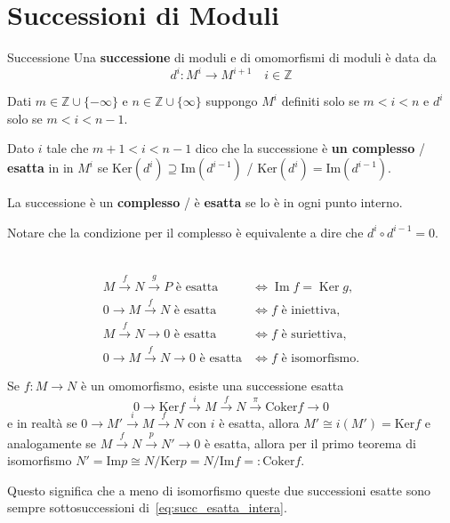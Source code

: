 \section{Successioni di Moduli}

\begin{definition}{Successione}
    Una \textbf{successione} di moduli e di omomorfismi di moduli è data da
    \[
      d^{i} : M^{i} \to M^{i+1} \quad i \in \mathbb{Z}
    \]

    Dati \(m \in \mathbb{Z} \cup \{-\infty\} \) e \(n \in \mathbb{Z} \cup
    \{\infty\} \) suppongo \(M^{i}\) definiti solo se \(m < i < n\) e \(d^{i}\)
    solo se \(m < i < n-1\).

    Dato \(i\) tale che \(m+1 < i < n-1\) dico che la successione è \textbf{un
    complesso} / \textbf{esatta} in in \(M^{i}\) se \(\mathrm{Ker}{(d^{i})}
    \supseteq \mathrm{Im}{(d^{i-1})} \) / \(\mathrm{Ker}{(d^{i})} =
    \mathrm{Im}{(d^{i-1})}\).

    La successione è un \textbf{complesso} / è \textbf{esatta} se lo è in ogni
    punto interno.
\end{definition}
\begin{remark}{}
    Notare che la condizione per il complesso è equivalente a dire che \(d^{i}
    \circ d^{i-1} = 0\).
\end{remark}
\begin{example} \(\) 
\begin{align*}
M \overset{f}{\to} N \overset{g}{\to} P \text{ è esatta}
    &\iff \operatorname{Im} f = \operatorname{Ker} g, \\
0 \to M \overset{f}{\to} N \text{ è esatta}
    &\iff f \text{ è iniettiva}, \\
M \overset{f}{\to} N \to 0 \text{ è esatta}
    &\iff f \text{ è suriettiva}, \\
0 \to M \overset{f}{\to} N \to 0 \text{ è esatta}
    &\iff f \text{ è isomorfismo}.
\end{align*}
\end{example}
\begin{remark}{}
    Se \(f : M \to N\) è un omomorfismo, esiste una successione esatta 
    \begin{equation}\label{eq:succ_esatta_intera}
      0 \to \mathrm{Ker}f \overset{i}{\to}  M \overset{f}{\to} N \overset{\pi}{\to}  \mathrm{Coker}f \to 0
    \end{equation}
    e in realtà se \(0 \to M' \overset{i}{\to} M \overset{f}{\to} N\) con \(i\)
    è esatta, allora \(M' \cong i{(M')} = \mathrm{Ker}f\) e
    analogamente se \(M \overset{f}{\to} N \overset{p}{\to} N' \to 0\) è esatta,
    allora per il primo teorema di isomorfismo \(N' = \mathrm{Im}p \cong N /
    \mathrm{Ker}p = N / \mathrm{Im} f =: \mathrm{Coker}f\).

    Questo significa che a meno di isomorfismo queste due successioni esatte
    sono sempre sottosuccessioni di~\eqref{eq:succ_esatta_intera}.
\end{remark}

